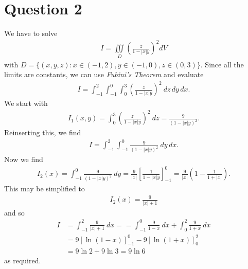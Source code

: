 \documentclass{article}
\newcommand{\ti}{\iiint\limits}
\begin{document}
\section*{Question 2}
We have to solve
\begin{align*}
  I = \ti_D \left(\frac{z}{1-|x|y}\right)^2 dV
\end{align*}
with $D=\{(x,y,z) : x\in(-1,2), y\in(-1,0), z\in(0,3)\}$. Since all the limits are constants,
we can use \emph{Fubini's Theorem} and evaluate
\begin{align*}
  I = \int_{-1}^2 \int_{-1}^0 \int_0^3 \left(\frac{z}{1-|x|y}\right)^2\:dz\,dy\,dx. 
\end{align*}
We start with
\begin{align*}
  I_1 (x,y) = \int_0^3 \left(\frac{z}{1-|x|y}\right)^2\:dz = \frac{9}{(1-|x|y)^2}.
\end{align*}
Reinserting this, we find
\begin{align*}
  I = \int_{-1}^2 \int_{-1}^0 \frac{9}{(1-|x|y)^2}\:dy\,dx.
\end{align*}
Now we find
\begin{align*}
  I_2 (x) = \int_{-1}^0 \frac{9}{(1-|x|y)^2}\:dy 
  = \frac{9}{|x|}\left[\frac{1}{1-|x|y}\right]_{-1}^0
  = \frac{9}{|x|}\left(1-\frac{1}{1+|x|}\right).
\end{align*}
This may be simplified to
\begin{align*}
  I_2(x)=\frac{9}{|x|+1}
\end{align*}
and so 
\begin{align*}
  I &= \int_{-1}^2 \frac{9}{|x|+1}\: dx = = \int_{-1}^0 \frac{9}{1-x}\:dx
  + \int_0^2 \frac{9}{1+x}\: dx\\
  &= 9\left[\ln(1-x)\right]_{-1}^0 - 9\left[\ln(1+x)\right]_0^2\\
  &=9\ln 2 + 9\ln 3 = 9\ln 6
\end{align*} 
as required.
\end{document}
